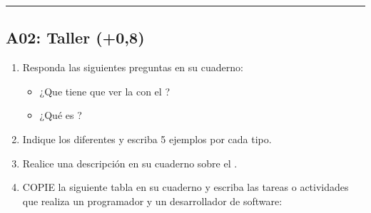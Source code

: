 \documentclass[letterpaper,10pt,spanish]{sphinxmanual}
\begin{document}
\bigskip\hrule\bigskip



\subsection{A02: Taller (+0,8)}
\label{\detokenize{1_guias/10programacion/G1021:a02-taller-0-8}}
\sphinxAtStartPar
{}
\begin{enumerate}
%
\item {} 
\sphinxAtStartPar
Responda las siguientes preguntas en su cuaderno:
\begin{itemize}
\item {} 
\sphinxAtStartPar
¿Que tiene que ver la  con el ?

\item {} 
\sphinxAtStartPar
¿Qué es ?

\end{itemize}

\item {} 
\sphinxAtStartPar
Indique los diferentes  y escriba 5 ejemplos por cada tipo.

\item {} 
\sphinxAtStartPar
Realice una descripción en su cuaderno sobre el .

\item {} 
\sphinxAtStartPar
COPIE la siguiente tabla en su cuaderno y escriba las tareas o actividades que realiza un programador y un desarrollador de software:

\end{enumerate}
\end{document}
